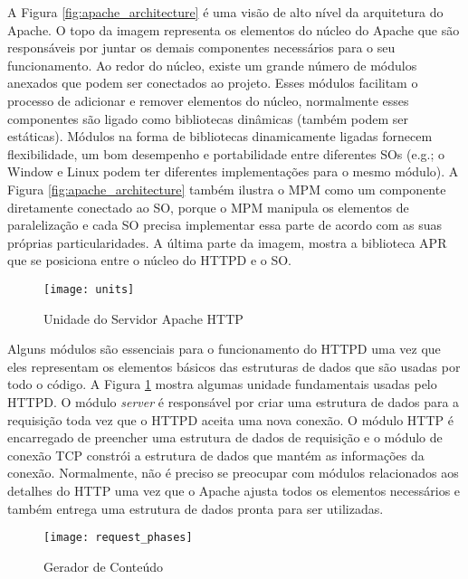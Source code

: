 A Figura \ref{fig:apache_architecture} é uma visão de alto nível da arquitetura
do Apache. O topo da imagem representa os elementos do núcleo do Apache que
são responsáveis por juntar os demais componentes necessários para o seu
funcionamento. Ao redor do núcleo, existe um grande número de módulos anexados
que podem ser conectados ao projeto. Esses módulos facilitam o processo de
adicionar e remover elementos do núcleo, normalmente esses componentes são
ligado como bibliotecas dinâmicas (também podem ser estáticas). Módulos na
forma de bibliotecas dinamicamente ligadas fornecem flexibilidade, um bom
desempenho e portabilidade entre diferentes SOs (e.g.; o Window e Linux podem
ter diferentes implementações para o mesmo módulo). A Figura
\ref{fig:apache_architecture} também ilustra o MPM como um componente
diretamente conectado ao SO, porque o MPM manipula os elementos de
paralelização e cada SO precisa implementar essa parte de acordo com as suas
próprias particularidades. A última parte da imagem, mostra a biblioteca APR
que se posiciona entre o núcleo do HTTPD e o SO.

\begin{figure}[!h]
  \centering
  \texttt{[image: units]} 
  \caption{Unidade do Servidor Apache HTTP}
  \label{fig:units} 
\end{figure}

Alguns módulos são essenciais para o funcionamento do HTTPD uma vez que eles
representam os elementos básicos das estruturas de dados que são usadas por
todo o código. A Figura \ref{fig:units} mostra algumas unidade fundamentais
usadas pelo HTTPD. O módulo \textit{server} é responsável por criar uma estrutura de
dados para a requisição toda vez que o HTTPD aceita uma nova conexão. O módulo
HTTP é encarregado de preencher uma estrutura de dados de requisição e o
módulo de conexão TCP constrói a estrutura de dados que mantém as informações
da conexão. Normalmente, não é preciso se preocupar com módulos relacionados
aos detalhes do HTTP uma vez que o Apache ajusta todos os elementos necessários
e também entrega uma estrutura de dados pronta para ser utilizadas.

\begin{figure}[!h]
  \centering
  \texttt{[image: request\_phases]} 
  \caption{Gerador de Conteúdo \citep{apache_module_book}}
  \label{fig:content_generator} 
\end{figure}

